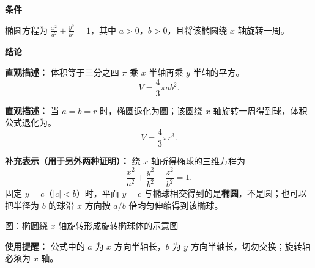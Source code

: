 \begin{statementbox}

	\textbf{\textcolor{CStatement}{条件}}
	\begin{description}[style=nextline, leftmargin=2.8em, labelsep=0.5em, itemsep=0.35em]
		\item[\textbf{\textcolor{CStatement}{条件 1（椭圆标准方程）：}}] 椭圆方程为 \(\frac{x^2}{a^2}+\frac{y^2}{b^2}=1\)，其中 \(a>0\)，\(b>0\)，且将该椭圆绕 \(x\) 轴旋转一周。
	\end{description}

	\textbf{\textcolor{CStatement}{结论}}
	\begin{description}[style=nextline, leftmargin=2.8em, labelsep=0.5em, itemsep=0.45em]
		\item[\textbf{\textcolor{CStatement}{结论一（旋转椭球体积）：}}]
		      \textbf{\textcolor{CStatement}{直观描述：}} 体积等于三分之四 \(\pi\) 乘 \(x\) 半轴再乘 \(y\) 半轴的平方。
		      \[
			      V=\frac{4}{3}\pi a b^{2}.
		      \]

		\item[\textbf{\textcolor{CStatement}{推广结论（球体退化特例）：}}]
		      \textbf{\textcolor{CStatement}{直观描述：}} 当 \(a=b=r\) 时，椭圆退化为圆；该圆绕 \(x\) 轴旋转一周得到球，体积公式退化为。
		      \[
			      V=\frac{4}{3}\pi r^{3}.
		      \]
	\end{description}
	\medskip
	\textbf{\textcolor{CStatement}{补充表示（用于另外两种证明）：}}
	绕 \(x\) 轴所得椭球的三维方程为
	\[
		\frac{x^{2}}{a^{2}}+\frac{y^{2}}{b^{2}}+\frac{z^{2}}{b^{2}}=1.
	\]
	固定 \(y=c\)（\(|c|<b\)）时，平面 \(y=c\) 与椭球相交得到的是\textbf{椭圆}，不是圆；也可以把半径为 \(b\) 的球沿 \(x\) 方向按 \(a/b\) 倍均匀伸缩得到该椭球。

	\begin{center}
		

		\vspace{0.4em}
		{\small 图：椭圆绕 \(x\) 轴旋转形成旋转椭球体的示意图}
	\end{center}
	\medskip
	\textbf{\textcolor{CStatement}{使用提醒：}}
	公式中的 \(a\) 为 \(x\) 方向半轴长，\(b\) 为 \(y\) 方向半轴长，切勿交换；旋转轴必须为 \(x\) 轴。

\end{statementbox}
